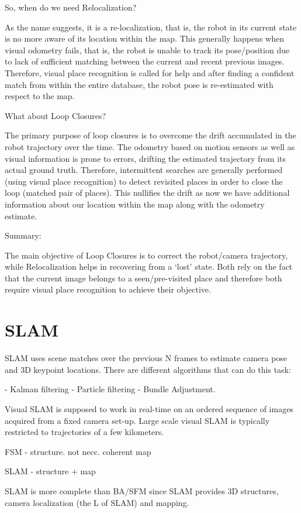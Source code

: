 So, when do we need Relocalization?

As the name suggests, it is a re-localization, that is, the robot in its current state is no more aware of its location within the map. This generally happens when visual odometry fails, that is, the robot is unable to track its pose/position due to lack of sufficient matching between the current and recent previous images. Therefore, visual place recognition is called for help and after finding a confident match from within the entire database, the robot pose is re-estimated with respect to the map.

What about Loop Closures?

The primary purpose of loop closures is to overcome the drift accumulated in the robot trajectory over the time. The odometry based on motion sensors as well as visual information is prone to errors, drifting the estimated trajectory from its actual ground truth. Therefore, intermittent searches are generally performed (using visual place recognition) to detect revisited places in order to close the loop (matched pair of places). This nullifies the drift as now we have additional information about our location within the map along with the odometry estimate.

Summary:

The main objective of Loop Closures is to correct the robot/camera trajectory, while Relocalization helps in recovering from a ‘lost’ state. Both rely on the fact that the current image belongs to a seen/pre-visited place and therefore both require visual place recognition to achieve their objective.


\section{SLAM}

SLAM uses scene matches over the previous N frames to estimate camera pose and 3D keypoint locations. There are different algorithms that can do this task:

- Kalman filtering
- Particle filtering
- Bundle Adjustment.

Visual SLAM is supposed to work in real-time on an ordered sequence of images acquired from a fixed camera set-up. Large scale visual SLAM is typically restricted to trajectories of a few kilometers.

FSM - structure. not necc. coherent map

SLAM - structure + map

SLAM is more complete than BA/SFM since SLAM provides 3D structures, camera localization (the L of SLAM) and mapping.

